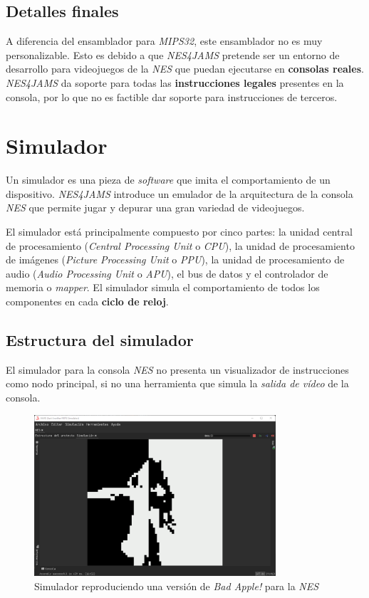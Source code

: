 \subsection{Detalles finales}\label{subsec:detalles-finales}

A diferencia del ensamblador para \textit{MIPS32},
este ensamblador no es muy personalizable.
Esto es debido a que \textit{NES4JAMS} pretende
ser un entorno de desarrollo para videojuegos de la \textit{NES}
que puedan ejecutarse en \textbf{consolas reales}.
\textit{NES4JAMS} da soporte para todas las
\textbf{instrucciones legales} presentes en la consola,
por lo que no es factible dar soporte para instrucciones
de terceros.


\section{Simulador}\label{sec:simulador}

Un simulador es una pieza de \textit{software} que imita el
comportamiento de un dispositivo.
\textit{NES4JAMS} introduce un emulador de la arquitectura
de la consola \textit{NES} que permite jugar y depurar
una gran variedad de videojuegos.

El simulador está principalmente compuesto por cinco partes:
la unidad central de procesamiento
(\textit{Central Processing Unit} o \textit{CPU}),
la unidad de procesamiento de imágenes
(\textit{Picture Processing Unit} o \textit{PPU}),
la unidad de procesamiento de audio
(\textit{Audio Processing Unit} o \textit{APU}),
el bus de datos y el controlador de memoria o \textit{mapper}.
El simulador simula el comportamiento de todos los componentes
en cada \textbf{ciclo de reloj}.

\subsection{Estructura del simulador}\label{subsec:estructura-del-simulador}

El simulador para la consola \textit{NES} no presenta un visualizador
de instrucciones como nodo principal, si no una herramienta que
simula la \textit{salida de vídeo} de la consola.

\begin{figure}[h]
    \centering
    \includegraphics[width=0.8\textwidth]{images/nes/nes-video}
    \caption{Simulador reproduciendo una versión de \textit{Bad Apple!} para la \textit{NES}}
    \label{fig:nes-video}
\end{figure}

